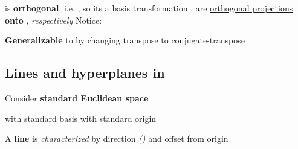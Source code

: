\begin{itemize}
            \begin{itemize}

                  \vItem
                         is \textbf{orthogonal}, i.e. , so
                        its a basis transformation
                  \vItem
                        ,
                        are \underline{orthogonal projections} \textbf{onto} ,
                         \emph{respectively}
                  \vItem
                        Notice:
            \end{itemize}
      \vItem
            \textbf{Generalizable} to  by
            changing transpose to conjugate-transpose
\end{itemize}

\subsection*{\texorpdfstring{Lines and hyperplanes in }{Lines and hyperplanes in}}

Consider \textbf{standard Euclidean space}

\begin{itemize}

      \vItem
            with standard basis
      \vItem
            with standard origin 
\end{itemize}

\hSep %

A \textbf{line}  is
\emph{characterized} by direction 
\emph{()} and offset from origin 

